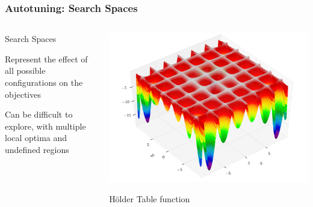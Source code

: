 \documentclass[10pt, compress, aspectratio=169, xcolor={table,usenames,dvipsnames}]{beamer}
\begin{document}
\begin{frame}
    \frametitle{Autotuning: Search Spaces}
    \begin{columns}[c]
            \begin{block}{Search Spaces}
                \vspace{.2cm}

                Represent the \alert{effect} of all possible
                \alert{configurations} on the \alert{objectives}

                Can be difficult to explore, with multiple \alert{local optima}
                and \alert{undefined regions}
            \end{block}

            \begin{block}{}
                \begin{center}
                    \includegraphics[width=.80\columnwidth]{holder_table}

                    \alert{Hölder Table function}
                \end{center}
            \end{block}

    \end{columns}
\end{frame}
\end{document}

